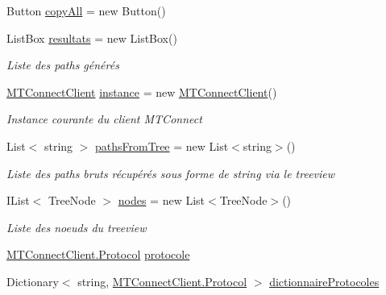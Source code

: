 \begin{DoxyCompactItemize}
Button \mbox{\hyperlink{class_m_t_connect_agent_1_1_user_control_display_tab_aa15d70b2eb99ccc3c793590fa01d6881}{copy\+All}} = new Button()
\item 
List\+Box \mbox{\hyperlink{class_m_t_connect_agent_1_1_user_control_display_tab_a083da92870ac6aad4307ae14a32bc561}{resultats}} = new List\+Box()
\begin{DoxyCompactList}\small\item\em Liste des paths générés \end{DoxyCompactList}\item 
\mbox{\hyperlink{class_m_t_connect_agent_1_1_b_l_l_1_1_m_t_connect_client}{M\+T\+Connect\+Client}} \mbox{\hyperlink{class_m_t_connect_agent_1_1_user_control_display_tab_a4bfdc2032bbe24566e9e4d7053438ab1}{instance}} = new \mbox{\hyperlink{class_m_t_connect_agent_1_1_b_l_l_1_1_m_t_connect_client}{M\+T\+Connect\+Client}}()
\begin{DoxyCompactList}\small\item\em Instance courante du client M\+T\+Connect \end{DoxyCompactList}\item 
List$<$ string $>$ \mbox{\hyperlink{class_m_t_connect_agent_1_1_user_control_display_tab_aefd62ca9c1f8ff816f6208332ae4860e}{paths\+From\+Tree}} = new List$<$string$>$()
\begin{DoxyCompactList}\small\item\em Liste des paths bruts récupérés sous forme de string via le treeview \end{DoxyCompactList}\item 
I\+List$<$ Tree\+Node $>$ \mbox{\hyperlink{class_m_t_connect_agent_1_1_user_control_display_tab_a70ccdb75ebd47abf8cf75656c5318492}{nodes}} = new List$<$Tree\+Node$>$()
\begin{DoxyCompactList}\small\item\em Liste des noeuds du treeview \end{DoxyCompactList}\item 
\mbox{\hyperlink{class_m_t_connect_agent_1_1_b_l_l_1_1_m_t_connect_client_a2f390f74a0ad3ee5147e9438ceed6474}{M\+T\+Connect\+Client.\+Protocol}} \mbox{\hyperlink{class_m_t_connect_agent_1_1_user_control_display_tab_a3471dd7677ae1037fe9319383ef5ccbd}{protocole}}
\item 
Dictionary$<$ string, \mbox{\hyperlink{class_m_t_connect_agent_1_1_b_l_l_1_1_m_t_connect_client_a2f390f74a0ad3ee5147e9438ceed6474}{M\+T\+Connect\+Client.\+Protocol}} $>$ \mbox{\hyperlink{class_m_t_connect_agent_1_1_user_control_display_tab_a1befb6328dc600965793a138d51ef77e}{dictionnaire\+Protocoles}}

\end{DoxyCompactItemize}
